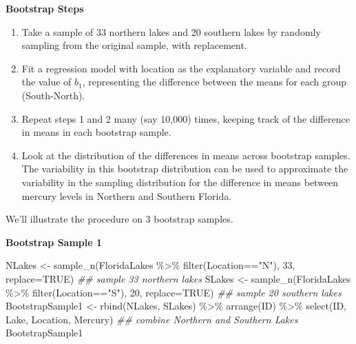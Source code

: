 \documentclass[
  letterpaper,
  DIV=11,
  numbers=noendperiod]{scrreprt}
\newenvironment{Shaded}{\begin{snugshade}}{\end{snugshade}}
\newcommand{\AttributeTok}[1]{\textcolor[rgb]{0.40,0.45,0.13}{#1}}
\newcommand{\ConstantTok}[1]{\textcolor[rgb]{0.56,0.35,0.01}{#1}}
\newcommand{\DecValTok}[1]{\textcolor[rgb]{0.68,0.00,0.00}{#1}}
\newcommand{\DocumentationTok}[1]{\textcolor[rgb]{0.37,0.37,0.37}{\textit{#1}}}
\newcommand{\FunctionTok}[1]{\textcolor[rgb]{0.28,0.35,0.67}{#1}}
\newcommand{\NormalTok}[1]{\textcolor[rgb]{0.00,0.23,0.31}{#1}}
\newcommand{\OtherTok}[1]{\textcolor[rgb]{0.00,0.23,0.31}{#1}}
\newcommand{\SpecialCharTok}[1]{\textcolor[rgb]{0.37,0.37,0.37}{#1}}
\newcommand{\StringTok}[1]{\textcolor[rgb]{0.13,0.47,0.30}{#1}}
\begin{document}
\textbf{Bootstrap Steps}

\begin{enumerate}
\def\labelenumi{\arabic{enumi}.}
\item
  Take a sample of 33 northern lakes and 20 southern lakes by randomly
  sampling from the original sample, with replacement.
\item
  Fit a regression model with location as the explanatory variable and
  record the value of \(b_1\), representing the difference between the
  means for each group (South-North).
\item
  Repeat steps 1 and 2 many (say 10,000) times, keeping track of the
  difference in means in each bootstrap sample.
\item
  Look at the distribution of the differences in means across bootstrap
  samples. The variability in this bootstrap distribution can be used to
  approximate the variability in the sampling distribution for the
  difference in means between mercury levels in Northern and Southern
  Florida.
\end{enumerate}

We'll illustrate the procedure on 3 bootstrap samples.

\textbf{Bootstrap Sample 1}

\begin{Shaded}
\begin{Highlighting}[]
\NormalTok{NLakes }\OtherTok{\textless{}{-}} \FunctionTok{sample\_n}\NormalTok{(FloridaLakes }\SpecialCharTok{\%\textgreater{}\%} \FunctionTok{filter}\NormalTok{(Location}\SpecialCharTok{==}\StringTok{"N"}\NormalTok{), }\DecValTok{33}\NormalTok{, }\AttributeTok{replace=}\ConstantTok{TRUE}\NormalTok{)   }\DocumentationTok{\#\# sample 33 northern lakes}
\NormalTok{SLakes }\OtherTok{\textless{}{-}} \FunctionTok{sample\_n}\NormalTok{(FloridaLakes }\SpecialCharTok{\%\textgreater{}\%} \FunctionTok{filter}\NormalTok{(Location}\SpecialCharTok{==}\StringTok{"S"}\NormalTok{), }\DecValTok{20}\NormalTok{, }\AttributeTok{replace=}\ConstantTok{TRUE}\NormalTok{)   }\DocumentationTok{\#\# sample 20 southern lakes}
\NormalTok{BootstrapSample1 }\OtherTok{\textless{}{-}} \FunctionTok{rbind}\NormalTok{(NLakes, SLakes) }\SpecialCharTok{\%\textgreater{}\%} \FunctionTok{arrange}\NormalTok{(ID) }\SpecialCharTok{\%\textgreater{}\%} 
  \FunctionTok{select}\NormalTok{(ID, Lake, Location, Mercury)   }\DocumentationTok{\#\# combine Northern and Southern Lakes}
\NormalTok{BootstrapSample1}
\end{Highlighting}
\end{Shaded}
\end{document}
